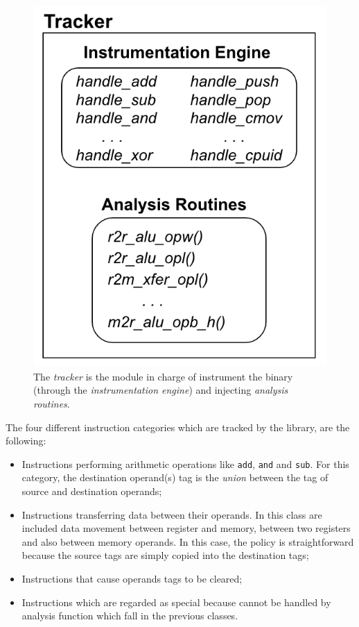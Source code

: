 \documentclass[LaM,binding=0.6cm]{sapthesis}
\begin{document}
\begin{figure}[h!]
\centering
\includegraphics[scale=.6]{images/techn13}
\caption{The \textit{tracker} is the module in charge of instrument the binary (through the \textit{instrumentation engine}) and injecting \textit{analysis routines}.}
\end{figure}

The four different instruction categories which are tracked by the library, are the following:
\begin{itemize}
\item Instructions performing arithmetic operations like \texttt{add}, \texttt{and} and \texttt{sub}. For this category, the destination operand(s) tag is the \textit{union} between the tag of source and destination operands;
\item Instructions transferring data between their operands. In this class are included data movement between register and memory, between two registers and also between memory operands. In this case, the policy is straightforward because the source tags are simply copied into the destination tags;
\item Instructions that cause operands tags to be cleared;
\item Instructions which are regarded as special because cannot be handled by analysis function which fall in the previous classes.
\end{itemize}
\end{document}
